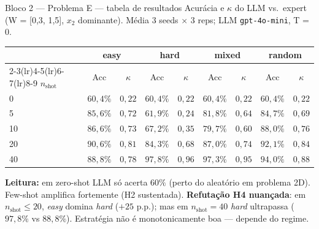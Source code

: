 \documentclass[aspectratio=169,10pt]{beamer}
\begin{document}
\begin{frame}{Bloco 2 --- Problema E --- tabela de resultados}
  \scriptsize
  Acur\'acia e $\kappa$ do LLM vs.\ expert (W = [0,3, 1,5], $x_2$ dominante). M\'edia 3 seeds $\times$ 3 reps; LLM \texttt{gpt-4o-mini}, T = 0.
  \begin{center}
  \begin{tabular}{lcccccccc}
    \toprule
    & \multicolumn{2}{c}{easy} & \multicolumn{2}{c}{hard} & \multicolumn{2}{c}{mixed} & \multicolumn{2}{c}{random} \\
    \cmidrule(lr){2-3}\cmidrule(lr){4-5}\cmidrule(lr){6-7}\cmidrule(lr){8-9}
    $n_{\text{shot}}$ & Acc & $\kappa$ & Acc & $\kappa$ & Acc & $\kappa$ & Acc & $\kappa$ \\
    \midrule
     0 & $60{,}4\%$ & $0{,}22$ & $60{,}4\%$ & $0{,}22$ & $60{,}4\%$ & $0{,}22$ & $60{,}4\%$ & $0{,}22$ \\
     5 & $85{,}6\%$ & $0{,}72$ & $61{,}9\%$ & $0{,}24$ & $81{,}8\%$ & $0{,}64$ & $84{,}7\%$ & $0{,}69$ \\
    10 & $86{,}6\%$ & $0{,}73$ & $67{,}2\%$ & $0{,}35$ & $79{,}7\%$ & $0{,}60$ & $88{,}0\%$ & $0{,}76$ \\
    20 & $90{,}6\%$ & $0{,}81$ & $84{,}3\%$ & $0{,}68$ & $87{,}0\%$ & $0{,}74$ & $92{,}1\%$ & $0{,}84$ \\
    40 & $88{,}8\%$ & $0{,}78$ & \textbf{$97{,}8\%$} & \textbf{$0{,}96$} & $97{,}3\%$ & $0{,}95$ & $94{,}0\%$ & $0{,}88$ \\
    \bottomrule
  \end{tabular}
  \end{center}
  \tiny
  \textbf{Leitura:} em zero-shot LLM s\'o acerta $60\%$ (perto do aleat\'orio em problema 2D). Few-shot amplifica fortemente (H2 sustentada). \textbf{Refuta\c{c}\~ao H4 nuan\c{c}ada}: em $n_{\text{shot}} \leq 20$, \emph{easy} domina \emph{hard} ($+25$ p.p.); mas em $n_{\text{shot}}=40$ \emph{hard} ultrapassa ($97{,}8\%$ vs $88{,}8\%$). Estrat\'egia n\~ao \'e monotonicamente boa --- depende do regime.
\end{frame}
\end{document}

